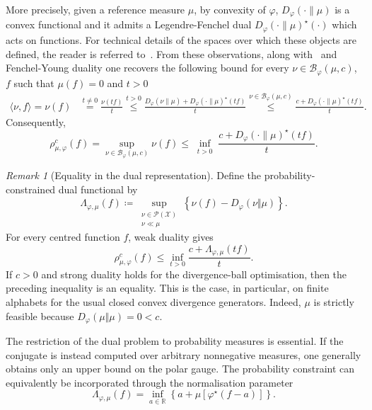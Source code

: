 \documentclass[11pt]{article}
\newcommand{\B}{\mathcal{B}}
\theoremstyle{plain}
\theoremstyle{remark}
\newtheorem{remark}{Remark}
\begin{document}
   More precisely, given a reference measure $\mu$, by convexity of $\varphi$, $D_\varphi(\cdot\|\mu)$ is a convex functional and it admits a Legendre-Fenchel dual $D_\varphi(\cdot\|\mu)^\star(\cdot)$ which acts on functions. For technical details of the spaces over which these objects are defined, the reader is referred to~\cite{minimizationMeasures,generalisedTPC}.
   From these observations, along with~ and Fenchel-Young duality one recovers the following bound for every $\nu \in \B_\varphi(\mu,c)$, $f$ such that $\mu(f)=0$ and $t>0$
   \begin{align}
        \langle \nu, f\rangle = \nu(f) &\overset{t\neq 0}{=} \frac{\nu(tf)}{t} \overset{t>0}{\leq} \frac{D_\varphi(\nu\|\mu) + D_\varphi(\cdot\|\mu)^\star(tf)}{t}\overset{\nu \in \B_\varphi(\mu,c)}{\leq} \frac{c + D_\varphi(\cdot\|\mu)^\star(tf)}{t}.
   \end{align}
   Consequently,
   \begin{equation}
        \rho_{\mu,\varphi}^c(f) = \sup_{\nu \in \B_\varphi(\mu,c)} \nu(f) \leq \inf_{\substack{t>0}} \frac{c + D_\varphi(\cdot\|\mu)^\star(tf)}{t}. \label{eq:amemiyaLikePhiFunctional}
   \end{equation}
   \begin{remark}[Equality in the dual representation]
Define the probability-constrained dual functional by
\begin{equation}
\Lambda_{\varphi,\mu}(f)
\coloneqq
\sup_{\substack{\nu\in\mathcal P(\mathcal X)\\ \nu\ll\mu}}
\left\{
\nu(f)-D_\varphi(\nu\Vert\mu)
\right\}.
\end{equation}
For every centred function $f$, weak duality gives
\begin{equation}
\rho_{\mu,\varphi}^{c}(f)
\leq
\inf_{t>0}
\frac{c+\Lambda_{\varphi,\mu}(tf)}{t}.
\end{equation}
If $c>0$ and strong duality holds for the divergence-ball
optimisation, then the preceding inequality is an equality. This is
the case, in particular, on finite alphabets for the usual closed
convex divergence generators. Indeed, $\mu$ is strictly feasible
because $D_\varphi(\mu\Vert\mu)=0<c$.

The restriction of the dual problem to probability measures is
essential. If the conjugate is instead computed over arbitrary
nonnegative measures, one generally obtains only an upper bound on
the polar gauge. The probability constraint can equivalently be
incorporated through the normalisation parameter
\begin{equation}
\Lambda_{\varphi,\mu}(f)
=
\inf_{a\in\mathbb R}
\left\{
a+\mu\!\left[\varphi^\star(f-a)\right]
\right\}.
\end{equation}
\end{remark}
\end{document}
